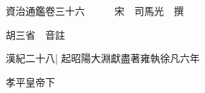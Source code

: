 






























































資治通鑑卷三十六　　　宋　司馬光　撰

胡三省　音註

漢紀二十八|{
	起昭陽大淵獻盡著雍執徐凡六年}


孝平皇帝下

